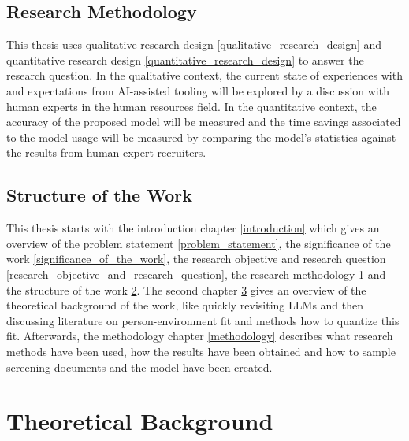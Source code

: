 \documentclass[draft,final]{thesisclass} %
\begin{document}
\section{Research Methodology} \label{research_methodology}
This thesis uses qualitative research design \ref{qualitative_research_design} and quantitative research design \ref{quantitative_research_design} to answer the research question.
In the qualitative context, the current state of experiences with and expectations from AI-assisted tooling will be explored by a discussion with human experts in the human resources field.
In the quantitative context, the accuracy of the proposed model will be measured and the time savings associated to the model usage will be measured by comparing the model's statistics against the results from human expert recruiters.

\section{Structure of the Work} \label{structure_of_the_work}
This thesis starts with the introduction chapter \ref{introduction} which gives an overview of the problem statement \ref{problem_statement}, the significance of the work \ref{significance_of_the_work}, the research objective and research question \ref{research_objective_and_research_question}, the research methodology \ref{research_methodology} and the structure of the work \ref{structure_of_the_work}.
The second chapter \ref{theoretical_background} gives an overview of the theoretical background of the work, like quickly revisiting \gls{LLM}s and then discussing literature on person-environment fit and methods how to quantize this fit.
Afterwards, the methodology chapter \ref{methodology} describes what research methods have been used, how the results have been obtained and how to sample screening documents and the model have been created.


\chapter{Theoretical Background} \label{theoretical_background}
\end{document}
